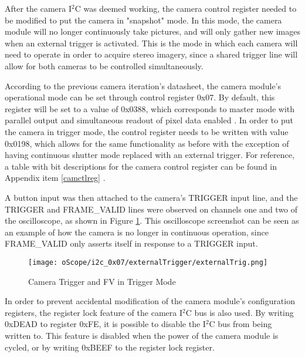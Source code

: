 \par
After the camera I$^2$C was deemed working, the camera control register needed to be modified to put the camera in "snapshot" mode. In this mode, the camera module will no longer continuously take pictures, and will only gather new images when an external trigger is activated. This is the mode in which each camera will need to operate in order to acquire stereo imagery, since a shared trigger line will allow for both cameras to be controlled simultaneously.
\par
According to the previous camera iteration's datasheet, the camera module's operational mode can be set through control register 0x07. By default, this register will be set to a value of 0x0388, which corresponds to master mode with parallel output and simultaneous readout of pixel data enabled \cite{mt9v032}. In order to put the camera in trigger mode, the control register needs to be written with value 0x0198, which allows for the same functionality as before with the exception of having continuous shutter mode replaced with an external trigger. For reference, a table with bit descriptions for the camera control register can be found in Appendix item \ref{camctlreg} \cite{mt9v032}.
\par
A button input was then attached to the camera's TRIGGER input line, and the TRIGGER and FRAME\_VALID lines were observed on channels one and two of the oscilloscope, as shown in Figure \ref{camInTrigMode}. This oscilloscope screenshot can be seen as an example of how the camera is no longer in continuous operation, since FRAME\_VALID only asserts itself in response to a TRIGGER input. 
\begin{figure}[H]
	\centerline{\texttt{[image: oScope/i2c\_0x07/externalTrigger/externalTrig.png]}}
	\caption{Camera Trigger and FV in Trigger Mode}
	\label{camInTrigMode}
\end{figure}
\par
In order to prevent accidental modification of the camera module's configuration registers, the register lock feature of the camera I$^2$C bus is also used. By writing 0xDEAD to register 0xFE, it is possible to disable the I$^2$C bus from being written to. This feature is disabled when the power of the camera module is cycled, or by writing 0xBEEF to the register lock register.
